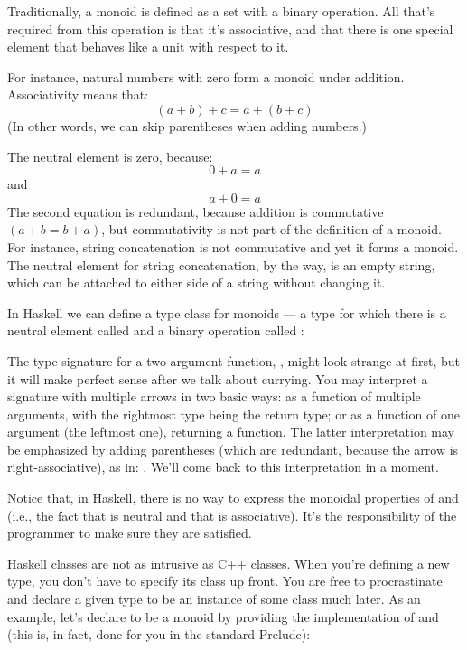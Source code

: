 Traditionally, a monoid is defined as a set with a binary operation. All
that's required from this operation is that it's associative, and that
there is one special element that behaves like a unit with respect to
it.

For instance, natural numbers with zero form a monoid under addition.
Associativity means that:
\[(a + b) + c = a + (b + c)\]
(In other words, we can skip parentheses when adding numbers.)

The neutral element is zero, because:
\[0 + a = a\]
and
\[a + 0 = a\]
The second equation is redundant, because addition is commutative $(a + b
= b + a)$, but commutativity is not part of the definition of a monoid.
For instance, string concatenation is not commutative and yet it forms a
monoid. The neutral element for string concatenation, by the way, is an
empty string, which can be attached to either side of a string without
changing it.

In Haskell we can define a type class for monoids --- a type for which
there is a neutral element called  and a binary operation
called :

The type signature for a two-argument function,
, might look strange at first,
but it will make perfect sense after we talk about currying. You may
interpret a signature with multiple arrows in two basic ways: as a
function of multiple arguments, with the rightmost type being the return
type; or as a function of one argument (the leftmost one), returning a
function. The latter interpretation may be emphasized by adding
parentheses (which are redundant, because the arrow is
right-associative), as in: .
We'll come back to this interpretation in a moment.

Notice that, in Haskell, there is no way to express the monoidal
properties of  and  (i.e., the fact that
 is neutral and that  is associative).
It's the responsibility of the programmer to make sure they are
satisfied.

Haskell classes are not as intrusive as C++ classes. When you're
defining a new type, you don't have to specify its class up front. You
are free to procrastinate and declare a given type to be an instance of
some class much later. As an example, let's declare  to
be a monoid by providing the implementation of  and
 (this is, in fact, done for you in the standard
Prelude):

